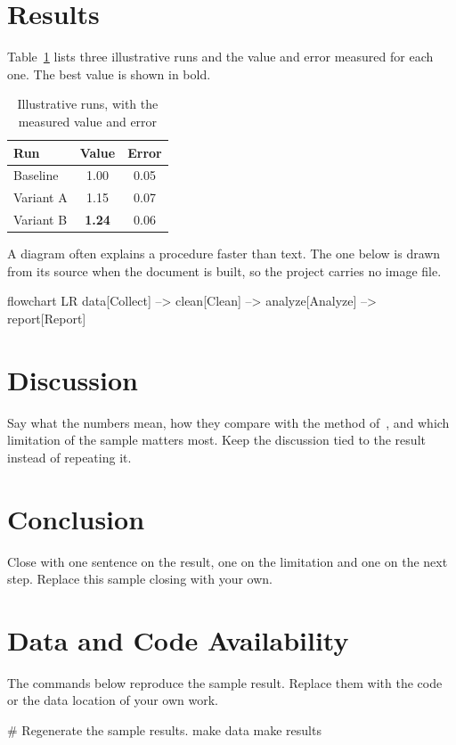 \documentclass[a4paper,11pt,twoside]{article}
\begin{document}
  \section{Results}
  Table~\ref{tab:runs} lists three illustrative runs and the value and error
  measured for each one. The best value is shown in bold.
  \begin{table}[H]
    \centering
    \caption{Illustrative runs, with the measured value and error}
    \label{tab:runs}
    \begin{tabular}{lcc}
      \toprule
      Run & Value & Error \\
      \midrule
      Baseline & 1.00 & 0.05 \\
      Variant A & 1.15 & 0.07 \\
      Variant B & \textbf{1.24} & 0.06 \\
      \bottomrule
    \end{tabular}
  \end{table}

  A diagram often explains a procedure faster than text. The one below is
  drawn from its source when the document is built, so the project carries no
  image file.
  \begin{mermaid}[style=editorial, caption={Sample workflow from data to result}]
    flowchart LR
    data[Collect] --> clean[Clean] --> analyze[Analyze] --> report[Report]
  \end{mermaid}

  \section{Discussion}
  Say what the numbers mean, how they compare with the method
  of~\cite{doe2023}, and which limitation of the sample matters most. Keep the
  discussion tied to the result instead of repeating it.

  \section{Conclusion}
  Close with one sentence on the result, one on the limitation and one on the
  next step. Replace this sample closing with your own.

  \section{Data and Code Availability}
  The commands below reproduce the sample result. Replace them with the code
  or the data location of your own work.
  \begin{code}[lang=bash]
# Regenerate the sample results.
make data
make results
  \end{code}

  
  
\end{document}
